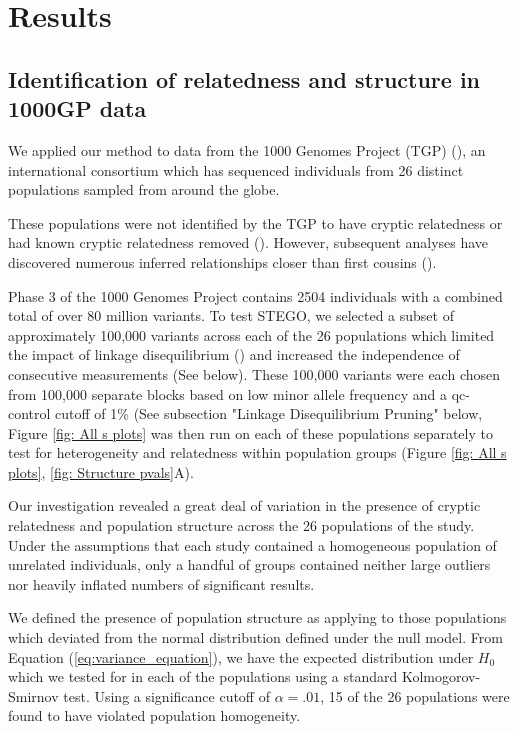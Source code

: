 \section{Results}

\subsection{Identification of relatedness and structure in 1000GP data}

We applied our method to data from the 1000 Genomes Project (TGP)
(\citealp{10002012integrated,10002015global}), an international consortium
which has sequenced individuals from 26 distinct populations sampled
from around the globe.

These populations were not identified by the TGP to have cryptic relatedness
or had known cryptic relatedness removed (\citealp{1000GPcrypticppt}).
However, subsequent analyses have discovered numerous inferred relationships
closer than first cousins (\citealp{gazal2015high,al2015inference,fedorova2016atlas}).

Phase 3 of the 1000 Genomes Project contains 2504 individuals with
a combined total of over 80 million variants. To test STEGO, we selected
a subset of approximately 100,000 variants across each of the 26 populations
which limited the impact of linkage disequilibrium (\citealp{price2008long})
and increased the independence of consecutive measurements (See below).  These 100,000 variants were each chosen from 100,000 separate blocks based on low minor allele frequency and a qc-control cutoff of 1\% (See subsection "Linkage Disequilibrium Pruning" below, Figure \ref{fig: All s plots} was then run on each of these populations separately
to test for heterogeneity and relatedness within population groups (Figure \ref{fig: All s plots}, \ref{fig: Structure pvals}A).

Our investigation revealed a great deal of variation in the presence
of cryptic relatedness and population structure across the 26 populations
of the study. Under the assumptions that each study contained a homogeneous
population of unrelated individuals, only a handful of groups contained
neither large outliers nor heavily inflated numbers of significant
results.

We defined the presence of population structure as applying to those
populations which deviated from the normal distribution defined under
the null model. From Equation (\ref{eq:variance_equation}), we have
the expected distribution under $H_{0}$ which we tested for in each
of the populations using a standard Kolmogorov-Smirnov test. Using
a significance cutoff of $\alpha=.01$, 15 of the 26 populations were
found to have violated population homogeneity. 

